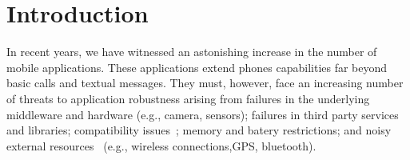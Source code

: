 \documentclass[conference]{IEEEtran}
\begin{document}







\section{Introduction}

In recent years, we have witnessed an astonishing increase in the number of
mobile applications. These applications extend phones capabilities 
far beyond basic calls and textual messages. They must, however,
face an increasing number of threats to application robustness
 arising from failures in the underlying middleware and hardware (e.g., camera, sensors);
failures in third party services and libraries; compatibility issues~\cite{McDon13}; 
 memory and batery restrictions; and noisy external resources~\cite{Zhang12} 
(e.g., wireless connections,GPS, bluetooth). 
\end{document}
